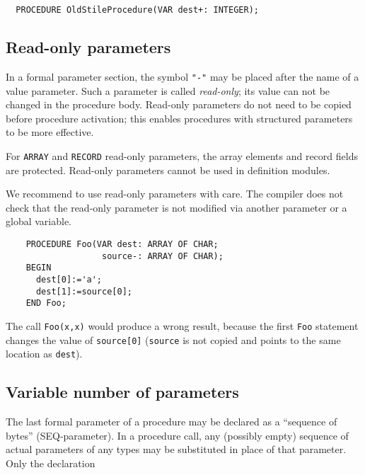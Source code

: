 \Example
\begin{verbatim}
  PROCEDURE OldStileProcedure(VAR dest+: INTEGER);
\end{verbatim}


\subsection{Read-only parameters}\label{m2:ext:RO_param}

\mextonly

In a formal parameter section, the symbol \verb|"-"| may be
placed after the name of a value parameter.  Such a parameter is
called {\em read-only}; its value can not be changed in the
procedure body. Read-only parameters do not need to be copied before
procedure activation; this enables procedures
with structured parameters to be more effective.

For \verb'ARRAY' and \verb'RECORD' read-only parameters,
the array elements and record fields are protected.
Read-only parameters cannot be used in definition modules.

We recommend to use read-only parameters with care. The compiler
does not check that the read-only parameter is not modified via
another parameter or a global variable.

\Example
\begin{verbatim}
    PROCEDURE Foo(VAR dest: ARRAY OF CHAR;
                   source-: ARRAY OF CHAR);
    BEGIN
      dest[0]:='a';
      dest[1]:=source[0];
    END Foo;
\end{verbatim}

The call \verb|Foo(x,x)| would produce a wrong result, because
the first \verb'Foo' statement changes the value of \verb|source[0]|
(\verb|source| is not copied and points to the same location
as \verb|dest|).



\subsection{Variable number of parameters}\label{m2:SEQ:param}

\mextonly

The last formal parameter of a procedure may be declared as a
``sequence of bytes'' (SEQ-parameter). In a procedure call, any
(possibly empty) sequence of actual parameters of any types
may be substituted in place of that parameter.
Only the declaration


